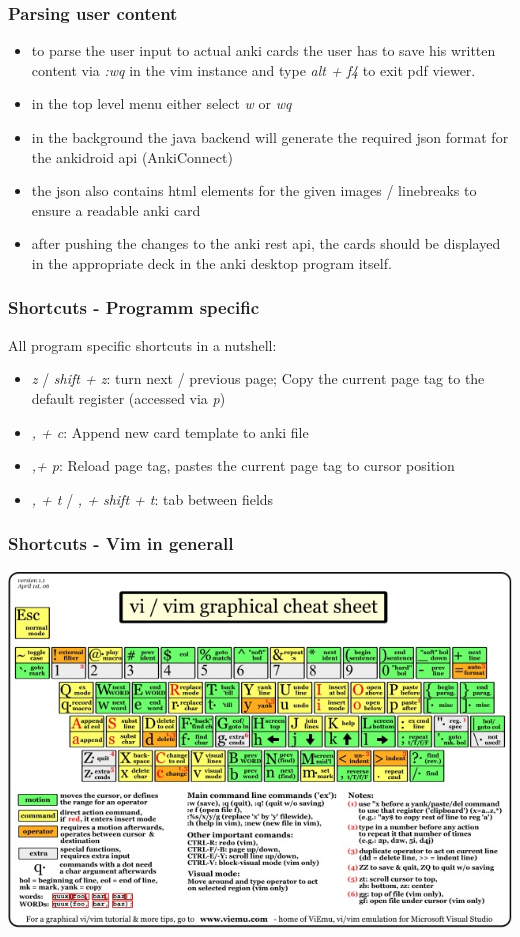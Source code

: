 \documentclass[xcolor=dvipanames]{beamer}
\begin{document}
	\begin{frame}
		\frametitle{Parsing user content}
		\begin{itemize}
			\item to parse the user input to actual anki cards the user has to save his written content via \emph{:wq} in the vim instance and type \emph{alt + f4} to exit pdf viewer. 
			\item in the top level menu either select \emph{w} or \emph{wq}
			\item in the background the java backend will generate the required json format for the ankidroid api (AnkiConnect)
			\item the json also contains html elements for the given images / linebreaks to ensure a readable anki card 
			\item after pushing the changes to the anki rest api, the cards should be displayed in the appropriate deck in the anki desktop program itself.
		\end{itemize}
	\end{frame}
	
	\begin{frame}
		\frametitle{Shortcuts - Programm specific}
		All program specific shortcuts in a nutshell: 
		\begin{itemize}
			\item \emph{z} / \emph{shift + z}: turn next / previous page; Copy the current page tag to the default register (accessed via \emph{p})
			\item \emph{, + c}: Append new card template to anki file
			\item \emph{,+ p}: Reload page tag, pastes the current page tag to cursor position
			\item \emph{, + t} / \emph{, + shift + t}: tab between fields
		\end{itemize}
	\end{frame}
	
	\begin{frame}
		\frametitle{Shortcuts - Vim in generall}
		\begin{center}
			\includegraphics[scale=.48]{./img/vim-cheat-sheet.jpg}
		\end{center}
	\end{frame}
		
	
	
\end{document}
